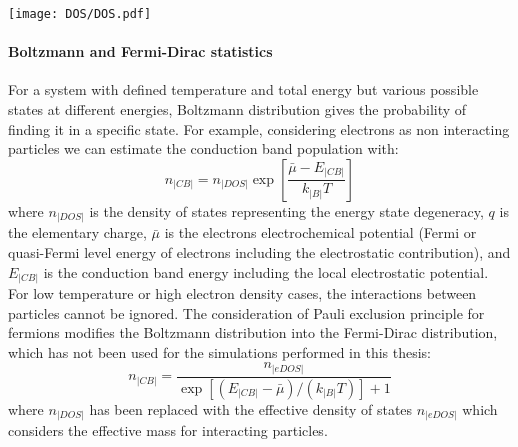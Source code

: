 		\begin{SCfigure}
			\centering
			\texttt{[image: DOS/DOS.pdf]}
			\label{fig:DOS}
		\end{SCfigure}
		

		\paragraph{Boltzmann and Fermi-Dirac statistics}\label{intro_statistics}
		For a system with defined temperature and total energy but various possible states at different energies, Boltzmann distribution gives the probability of finding it in a specific state.
		For example, considering electrons as non interacting particles we can estimate the conduction band population with:
		\begin{equation}\label{eq:boltzmann}
			n_|CB| = n_|DOS|\exp[\frac{\bar\mu-E_|CB|}{k_|B|T}]
		\end{equation}
		where $n_|DOS|$ is the density of states representing the energy state degeneracy, $q$ is the elementary charge, $\bar\mu$ is the electrons electrochemical potential (Fermi or quasi\hyp{}Fermi level energy of electrons including the electrostatic contribution), and $E_|CB|$ is the conduction band energy including the local electrostatic potential.
		For low temperature or high electron density cases, the interactions between particles cannot be ignored.
		The consideration of Pauli exclusion principle for fermions modifies the Boltzmann distribution into the Fermi\hyp{}Dirac distribution, which has not been used for the simulations performed in this thesis:
		\begin{equation}\label{eq:fermidirac}
		n_|CB| = \frac{n_|eDOS|}{\exp[(E_|CB|-\bar\mu)/(k_|B|T)]+1}
		\end{equation}
		where $n_|DOS|$ has been replaced with the effective density of states $n_|eDOS|$ which considers the effective mass for interacting particles.

